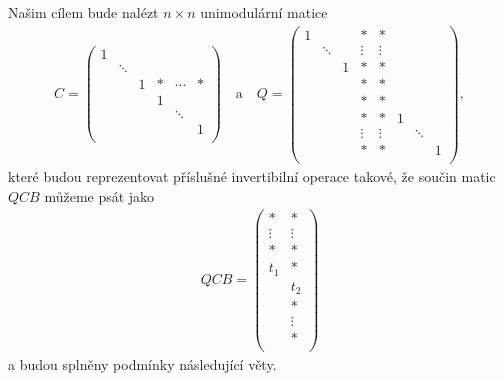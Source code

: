 Našim cílem bude nalézt $ n \times n $ unimodulární matice
\begin{align} \label{Q_C}
C =
    \begin{pmatrix}
        1 &        &   &      &        &     \\
          & \ddots &   &      &        &     \\
          &        & 1 & \ast & \cdots & \ast \\
          &        &   & 1    &        &     \\
          &        &   &      & \ddots &     \\
          &        &   &      &        & 1   \\
    \end{pmatrix}
\quad \text{a} \quad
Q =
    \begin{pmatrix}
        1 &        &   & \ast   & \ast   &   &        &   \\
          & \ddots &   & \vdots & \vdots &   &        &   \\
          &        & 1 & \ast   & \ast   &   &        &   \\
          &        &   & \ast   & \ast   &   &        &   \\
          &        &   & \ast   & \ast   &   &        &   \\
          &        &   & \ast   & \ast   & 1 &        &   \\
          &        &   & \vdots & \vdots &   & \ddots &   \\
          &        &   & \ast   & \ast   &   &        & 1 \\
    \end{pmatrix}
,
\end{align}
které budou reprezentovat příslušné invertibilní operace takové, že součin matic
$ QCB $ můžeme psát jako
\begin{align} \label{QCB}
QCB =
    \begin{pmatrix}
        \ast   & \ast   \\
        \vdots & \vdots \\
        \ast   & \ast   \\
        t_1    & \ast   \\
               & t_2    \\
               & \ast   \\
               & \vdots \\
               & \ast   \\
    \end{pmatrix}
\end{align}
a budou splněny podmínky následující věty.

